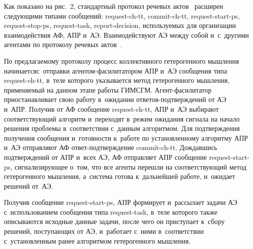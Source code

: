 \begin{multicols}{2}
  Как показано на рис.~2, стандартный протокол речевых актов~\cite{18-kol} расширен 
сле\-ду\-ющи\-ми типами сообщений: request-ch-tt, commit-ch-tt, request-start-ps, 
request-stop-ps, request-task, report-decision, используемых для организации 
взаимодействия АФ, АПР и~АЭ. Взаимодействуют АЭ между собой 
и~с~другими агентами по протоколу речевых актов~\cite{18-kol}.
  
  По предлагаемому протоколу процесс коллективного гетерогенного 
мышления начинается\linebreak с~отправки агентом-фа\-си\-ли\-та\-то\-ром АПР и~АЭ\linebreak 
сообщения типа request-ch-tt, в~теле которого указывается метод гетерогенного 
мышления, при\-ме\-ня\-емый на данном этапе работы \mbox{ГИМСГМ}. Агент-фа\-си\-ли\-та\-тор 
приостанавливает свою работу\linebreak
 в~ожидании от\-ве\-тов-под\-тверж\-де\-ний от АЭ 
и~АПР. Получив от АФ сообщение request-ch-tt, АПР и~АЭ выбирают 
соответствующий алгоритм и~переходят в~режим ожидания сигнала на начало 
решения проб\-ле\-мы в~соответствии с~данным алгоритмом. Для подтверждения 
получения сообщения и~го\-тов\-ности к~работе по установленному алгоритму 
АПР и~АЭ отправляют АФ от\-вет-под\-тверж\-де\-ние commit-ch-tt. Дождавшись 
под\-тверж\-де\-ний от АПР и~всех АЭ, АФ отправляет АПР сообщение  
request-start-ps, сиг\-на\-ли\-зи\-ру\-ющее о~том, что все агенты перешли на 
соответствующий метод гетерогенного мышления, а~сис\-те\-ма готова 
к~дальнейшей работе, и~ожидает решений от~АЭ. 
  
  Получив сообщение request-start-ps, АПР формирует и~рассылает задачи АЭ 
с~использованием сообщения типа request-task, в~теле которого так\-же 
описываются исходные данные задачи, после чего он при\-сту\-па\-ет к~сбору 
решений, поступающих от АЭ, и~работает с~ними в~соответствии 
с~установленным ранее алгоритмом гетерогенного мыш\-ле\-ния.\linebreak\vspace*{-12pt}

\pagebreak

\end{multicols}

\begin{figure*} %
\vspace*{1pt}
    \begin{center}  
  \mbox{%
 \epsfxsize=160.791mm 
 }
 \end{center}
\vspace*{-4pt}
\vspace*{3pt}
\end{figure*}

